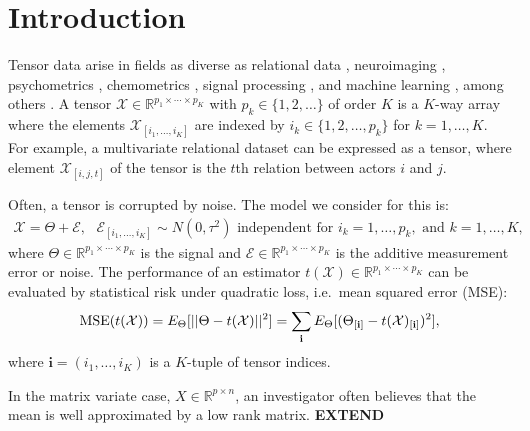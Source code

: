 \section{Introduction}
\label{sec:intro}

Tensor data arise in fields as diverse as relational data
\citep{hoff2014multilinear}, neuroimaging
\citep{zhang2014tensor,li2015parsimonious}, psychometrics
\citep{kiers2001three}, chemometrics
\citep{smilde2005multi,bro2006review}, signal processing
\citep{cichockitensor}, and machine learning
\citep{tao2005supervised}, among others
\citep{kroonenberg2008applied}.
A tensor $\mathcal{X} \in \mathbb{R}^{p_1\times\cdots\times p_K}$ with
$p_k \in \{1,2,\ldots\}$ of order $K$ is a $K$-way array where the
elements $\mathcal{X}_{[i_1,\ldots,i_K]}$ are indexed by $i_k \in
\{1,2,\ldots,p_k\}$ for $k = 1,\ldots,K$. For example, a multivariate
relational dataset can be expressed as a tensor, where element
$\mathcal{X}_{[i,j,t]}$ of the tensor is the $t$th relation between
actors $i$ and $j$.

Often, a tensor is corrupted by noise. The model we consider for this
is:
\begin{align}
  \label{equation:normal.model}
  \mathcal{X} = \Theta + \mathcal{E},\text{  } \mathcal{E}_{[i_1,\ldots,i_K]} \sim N(0,\tau^2) \text{ independent for } i_k = 1,\ldots,p_k, \text{ and } k = 1,\ldots,K,
\end{align}
where $\Theta \in \mathbb{R}^{p_1\times\cdots\times p_K}$ is the
signal and $\mathcal{E} \in \mathbb{R}^{p_1\times\cdots\times p_K}$ is
the additive measurement error or noise. The performance of an
estimator $t(\mathcal{X})\in \mathbb{R}^{p_1\times\cdots\times p_K}$
can be evaluated by statistical risk under quadratic loss, i.e.\ mean
squared error (MSE):
\begin{align}
  \label{equation:mse}
  \operatorname*{MSE}(t(\mathcal{X})) = E_{\Theta}[||\Theta - t(\mathcal{X})||^2] = \sum_{\mathbf{i}} E_{\Theta}[(\Theta_{[\mathbf{i}]} - t(\mathcal{X})_{[\mathbf{i}]})^2],
\end{align}
where $\mathbf{i} = (i_1,\ldots,i_K)$ is a $K$-tuple of tensor
indices.

In the matrix variate case, $X \in \mathbb{R}^{p \times n}$, an
investigator often believes that the mean is well approximated by a
low rank matrix. \textbf{EXTEND}

